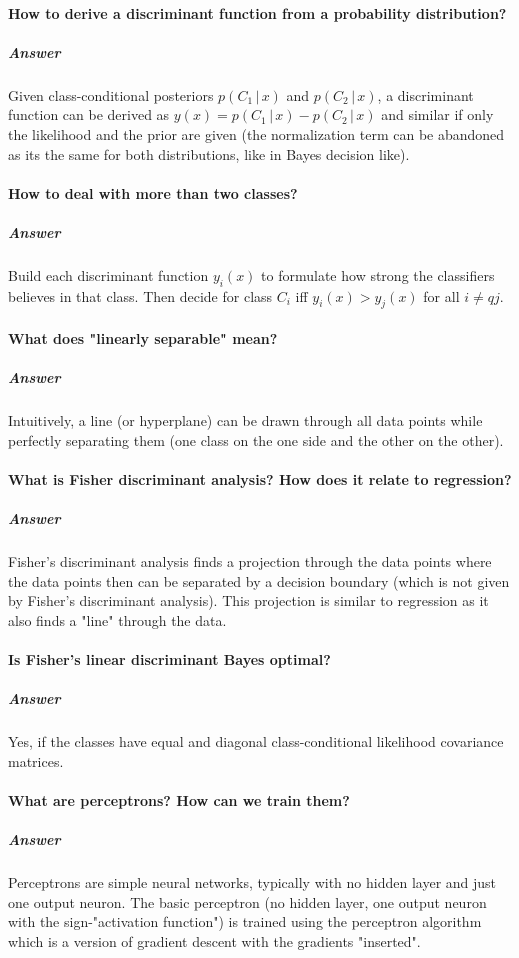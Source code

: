\documentclass[a4paper, 11pt, accentcolor = tud3b]{tudreport}
\newcommand{\answer}[1]{\subparagraph{Answer} #1}
\newcommand{\given}{\ensuremath{\,\vert\,}}
\begin{document}
			\paragraph{How to derive a discriminant function from a probability distribution?} %
			\answer{Given class-conditional posteriors \( p(C_1 \given x) \) and \( p(C_2 \given x) \), a discriminant function can be derived as \( y(x) = p(C_1 \given x) - p(C_2 \given x) \) and similar if only the likelihood and the prior are given (the normalization term can be abandoned as its the same for both distributions, like in Bayes decision like).}

			\paragraph{How to deal with more than two classes?}
			\answer{Build each discriminant function \( y_i(x) \) to formulate how strong the classifiers believes in that class. Then decide for class \( C_i \) iff \( y_i(x) > y_j(x) \) for all \( i \ne qj \).}

			\paragraph{What does "linearly separable" mean?}
			\answer{Intuitively, a line (or hyperplane) can be drawn through all data points while perfectly separating them (one class on the one side and the other on the other).}

			\paragraph{What is Fisher discriminant analysis? How does it relate to regression?} %
			\answer{Fisher's discriminant analysis finds a projection through the data points where the data points then can be separated by a decision boundary (which is not given by Fisher's discriminant analysis). This projection is similar to regression as it also finds a "line" through the data.}

			\paragraph{Is Fisher's linear discriminant Bayes optimal?}
			\answer{Yes, if the classes have equal and diagonal class-conditional likelihood covariance matrices.}

			\paragraph{What are perceptrons? How can we train them?} %
			\answer{Perceptrons are simple neural networks, typically with no hidden layer and just one output neuron. The basic perceptron (no hidden layer, one output neuron with the sign-"activation function") is trained using the perceptron algorithm which is a version of gradient descent with the gradients "inserted".}
\end{document}
